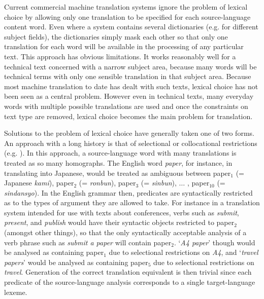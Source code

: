 Current commercial machine translation systems ignore the problem of
lexical choice by allowing only one translation to be specified for each
source-language content word.
Even where a system contains several dictionaries (e.g. for different subject
fields), the dictionaries simply mask each other so that only one translation
for each word will be available in the processing of any particular text.
This approach has obvious limitations. It works reasonably well for a
technical text concerned with
a narrow subject area, because many words will be technical terms with only one
sensible translation in that subject area. Because most machine translation
to date has dealt with such texts, lexical choice has not been seen as a
central problem. However even in technical texts, many everyday words with
multiple possible translations are used and once the constraints on text
type are removed, lexical choice becomes the main problem for translation. 

Solutions to the problem of lexical choice have generally taken one of
two forms. An approach with a long history is that of selectional or
collocational restrictions (e.g. \cite{lehrberger:82:a}). In this approach, a
source-language word with many translations is treated as so many homographs.
The English word
{\it paper},
for instance, in translating into Japanese, would be treated as ambiguous
between paper$_1$ (= Japanese {\it kami}),
paper$_2$ (=
{\it ronbun\/}),
paper$_3$ (=
{\it sinbun\/}),
$\ldots$ , paper$_{10}$ (=
{\it sindansyo\/}).
In the English grammar then, predicates are syntactically restricted as
to the types of argument they are allowed to take. For instance in a
translation system intended for use with texts about conferences,
verbs such as
{\it submit},
{\it present},
and
{\it publish\/}
would have their syntactic objects restricted to paper$_2$ (amongst other
things), so that the only syntactically acceptable analysis of a verb
phrase such as {\it submit a paper\/} will contain paper$_2$.
`{\it A4 paper\/}' though would be analysed as containing paper$_1$ due to
selectional restrictions on
{\it A4},
and `{\it travel papers\/}' would be analysed as containing paper$_5$
due to selectional restrictions on
{\it travel\/}.
Generation of the correct translation equivalent is then trivial since each
predicate of the source-language analysis corresponds to a single
target-language lexeme.


